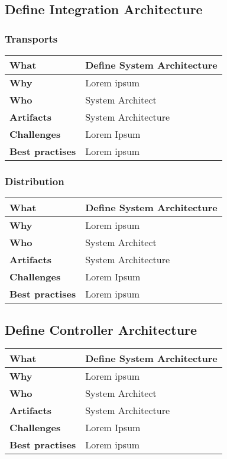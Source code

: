 \subsection{Define Integration Architecture}
\subsubsection{Transports}
 \label{table:ch6_Task_Define_System_Architect}
\begin{tabular}
	{|m{3cm}|m{10cm}|} \hline \bfseries What & Define System Architecture\\
	\hline \bfseries Why & Lorem ipsum\\
	\hline \bfseries Who & System Architect\\
	\hline \bfseries Artifacts & System Architecture\\
	\hline \bfseries Challenges & Lorem Ipsum\\
	\hline \bfseries Best practises & Lorem ipsum\\
	\hline 
\end{tabular}

\subsubsection{Distribution}
 \label{table:ch6_Task_Define_System_Architect}
\begin{tabular}
	{|m{3cm}|m{10cm}|} \hline \bfseries What & Define System Architecture\\
	\hline \bfseries Why & Lorem ipsum\\
	\hline \bfseries Who & System Architect\\
	\hline \bfseries Artifacts & System Architecture\\
	\hline \bfseries Challenges & Lorem Ipsum\\
	\hline \bfseries Best practises & Lorem ipsum\\
	\hline 
\end{tabular}

\subsection{Define Controller Architecture}
 \label{table:ch6_Task_Define_System_Architect}
\begin{tabular}
	{|m{3cm}|m{10cm}|} \hline \bfseries What & Define System Architecture\\
	\hline \bfseries Why & Lorem ipsum\\
	\hline \bfseries Who & System Architect\\
	\hline \bfseries Artifacts & System Architecture\\
	\hline \bfseries Challenges & Lorem Ipsum\\
	\hline \bfseries Best practises & Lorem ipsum\\
	\hline 
\end{tabular}


